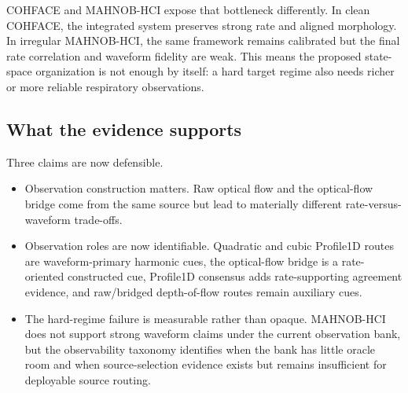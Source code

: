 \documentclass[fleqn,10pt]{wlscirep}
\begin{document}
COHFACE and MAHNOB-HCI expose that bottleneck differently. In clean COHFACE,
the integrated system preserves strong rate and aligned morphology. In
irregular MAHNOB-HCI, the same framework remains calibrated but the final rate
correlation and waveform fidelity are weak. This means the proposed state-space
organization is not enough by itself: a hard target regime also needs richer or
more reliable respiratory observations.

\subsection*{What the evidence supports}
Three claims are now defensible.
\begin{itemize}[nosep]
\item Observation construction matters. Raw optical flow and the optical-flow
bridge come from the same source but lead to materially different
rate-versus-waveform trade-offs.
\item Observation roles are now identifiable. Quadratic and cubic Profile1D
routes are waveform-primary harmonic cues, the optical-flow bridge is a
rate-oriented constructed cue, Profile1D consensus adds rate-supporting
agreement evidence, and raw/bridged depth-of-flow routes remain auxiliary cues.
\item The hard-regime failure is measurable rather than opaque. MAHNOB-HCI does
not support strong waveform claims under the current observation bank, but the
observability taxonomy identifies when the bank has little oracle room and when
source-selection evidence exists but remains insufficient for deployable
source routing.
\end{itemize}
\end{document}
